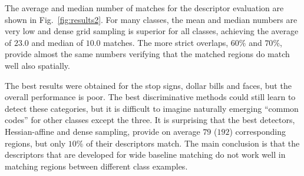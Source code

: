 \documentclass[review]{elsarticle}
\begin{document}
%
The average and median number of matches for the descriptor evaluation
are shown in Fig.~\ref{fig:results2}.
For many classes, the mean and median numbers are very low and
dense grid sampling is superior for
all classes, achieving the average of $23.0$ and median of $10.0$ matches.
The more strict overlaps, $60\%$ and $70\%$, provide almost the same numbers
verifying that the matched regions do match well also spatially.

The best results were obtained for the stop signs, dollar bills and
faces, but the overall performance is poor.
The best discriminative methods could still learn to detect these
categories, but it is difficult to imagine naturally emerging
``common codes'' for other classes except the three.
It is surprising that the best detectors, Hessian-affine and dense
sampling, provide on average $79$ ($192$) corresponding
regions, but only $10\%$ of their descriptors match.
The main conclusion is that the descriptors that
are developed for wide baseline matching do not work
well in matching regions between different class examples.
\end{document}
